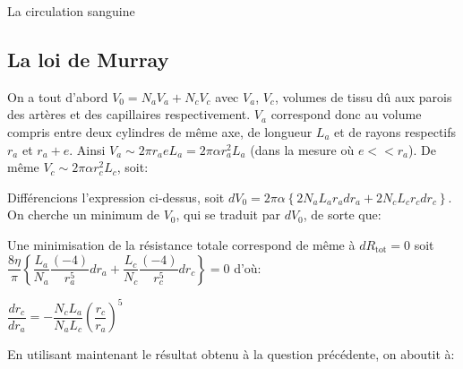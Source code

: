 \begin{exo}[PC][1][devoir]{La circulation sanguine}
\subsection{La loi de Murray}
\begin{quest}
  {
  On a tout d'abord $V_{0}=N_{a}V_{a}+N_{c}V_{c}$ avec $V_{a}$, $V_{c}$, volumes de tissu dû aux parois des artères et des capillaires respectivement. $V_{a}$ correspond donc au volume compris entre deux cylindres de même axe, de longueur $L_{a}$ et de rayons respectifs $r_{a}$ et $r_{a}+e$. Ainsi $V_{a}\sim 2\pi r_{a}eL_{a}=2\pi\alpha r^{2}_{a}L_{a}$ (dans la mesure où $e<<r_{a}$). De même $V_{c}\sim 2\pi\alpha r^{2}_{c}L_{c}$, soit:

  Différencions l'expression ci-dessus, soit $dV_{0}=2\pi\alpha\left\lbrace  2N_{a}L_{a}r_{a}dr_{a} + 2N_{c}L_{c}r_{c}dr_{c} \right\rbrace$. On cherche un minimum de $V_{0}$, qui se traduit par $dV_{0}$, de sorte que:
  }
  {
  Une minimisation de la résistance totale correspond de même à $dR_{\mathrm{tot}}=0$ soit $\dfrac{8\eta}{\pi}\left\lbrace \dfrac{L_{a}}{N_{a}} \dfrac{(-4)}{r_{a}^{5}} dr_{a} + \dfrac{L_{c}}{N_{c}} \dfrac{(-4)}{r_{c}^{5}} dr_{c} \right\rbrace =0$ d'où:
 \begin{center}
 $\dfrac{dr_{c}}{dr_{a}}=-\dfrac{N_{c}L_{a}}{N_{a}L_{c}} \left( \dfrac{r_{c}}{r_{a}} \right)^{5}$
 \end{center}
 En utilisant maintenant le résultat obtenu à la question précédente, on aboutit à:
  }


\end{quest}
\end{exo}

